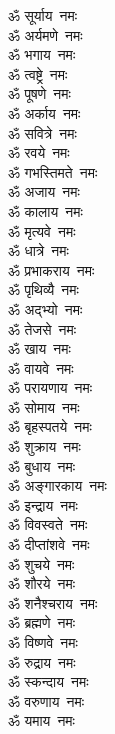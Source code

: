 \begin{multicols}{2}
    \begin{flushleft}
        ॐ सूर्याय~नमः\\
        ॐ अर्यमणे~नमः\\
        ॐ भगाय~नमः\\
        ॐ त्वष्ट्रे~नमः\\
        ॐ पूषणे~नमः\\
        ॐ अर्काय~नमः\\
        ॐ सवित्रे~नमः\\
        ॐ रवये~नमः\\
        ॐ गभस्तिमते~नमः\\
        ॐ अजाय~नमः\hfill{}\\
        ॐ कालाय~नमः\\
        ॐ मृत्यवे~नमः\\
        ॐ धात्रे~नमः\\
        ॐ प्रभाकराय~नमः\\
        ॐ पृथिव्यै~नमः\\
        ॐ अद्भ्यो~नमः\\
        ॐ तेजसे~नमः\\
        ॐ खाय~नमः\\
        ॐ वायवे~नमः\\
        ॐ परायणाय~नमः\hfill{}\\
        ॐ सोमाय~नमः\\
        ॐ बृहस्पतये~नमः\\
        ॐ शुक्राय~नमः\\
        ॐ बुधाय~नमः\\
        ॐ अङ्गारकाय~नमः\\
        ॐ इन्द्राय~नमः\\
        ॐ विवस्वते~नमः\\
        ॐ दीप्तांशवे~नमः\\
        ॐ शुचये~नमः\\
        ॐ शौरये~नमः\hfill{}\\
        ॐ शनैश्चराय~नमः\\
        ॐ ब्रह्मणे~नमः\\
        ॐ विष्णवे~नमः\\
        ॐ रुद्राय~नमः\\
        ॐ स्कन्दाय~नमः\\
        ॐ वरुणाय~नमः\\
        ॐ यमाय~नमः\\

\end{flushleft}
\end{multicols}

